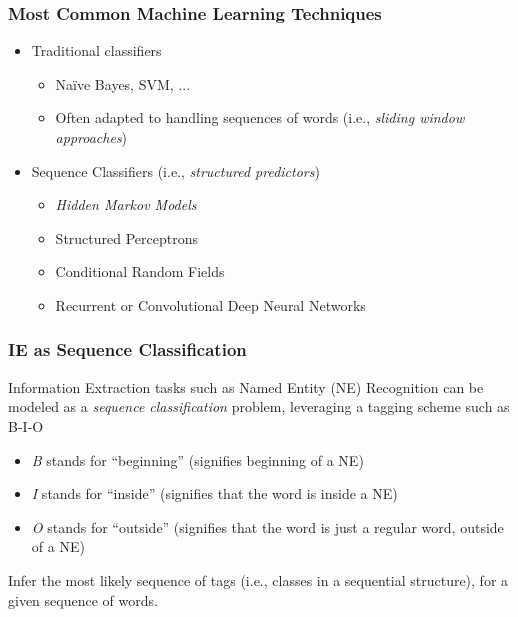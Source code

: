 \documentclass{beamer}
\begin{document}
\begin{frame}
  \frametitle{Most Common Machine Learning Techniques}
  \begin{itemize}
  \item Traditional classifiers
      \begin{itemize}
      \item Naïve Bayes, SVM, ...
      \item Often adapted to handling sequences of words (i.e., {\it sliding window approaches})
      \end{itemize}
  \item Sequence Classifiers (i.e., {\it structured predictors})
      \begin{itemize}
      \item \emph{Hidden Markov Models}
      \item Structured Perceptrons
      \item Conditional Random Fields
      \item Recurrent or Convolutional Deep Neural Networks
      \end{itemize}
  \end{itemize}
\end{frame}

\begin{frame}
  \frametitle{IE as Sequence Classification}
\begin{block}{}
Information Extraction tasks such as Named Entity (NE) Recognition can be modeled as a \emph{sequence classification} problem, leveraging a tagging scheme such as B-I-O
\end{block}
\begin{itemize}
\item \emph{B} stands for ``beginning'' (signifies beginning of a NE)
\item \emph{I} stands for ``inside'' (signifies that the word is inside a NE)
\item \emph{O} stands for ``outside'' (signifies that the word is just a regular word, outside of a NE)
\end{itemize}
\begin{block}{}
Infer the most likely sequence of tags (i.e., classes in a sequential structure), for a given sequence of words.
\end{block}
\end{frame}


\end{document}
